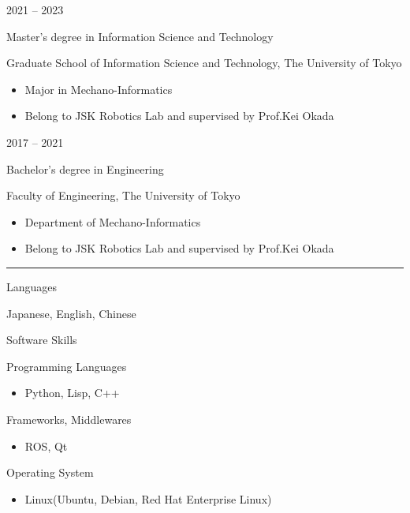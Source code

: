 \documentclass[a4paper,10pt]{article}
\newlength{\cvcolumngapwidth}
\newlength{\cvleftcolumnwidth}
\newlength{\cvrightcolumnwidth}
\newcommand{\cvsectionstyle}[1]{{\normalsize\cvsectionfont\textcolor{cvsectioncolor}{#1}}}
\newcommand{\cvtitlestyle}[1]{{\large\cvtitlefont\textcolor{cvtitlecolor}{#1}}}
\newcommand{\cvdurationstyle}[1]{{\small\cvdurationfont\textcolor{cvdurationcolor}{#1}}}
\newcommand{\cvheadingstyle}[1]{{\normalsize\cvheadingfont\textcolor{cvheadingcolor}{#1}}}
\newlength{\cvafteritemskipamount}
\newlength{\cvaftersectionskipamount}
\newlength{\cvbetweensectionandheadingextraskipamount}
\newlength{\cvaftertitleskipamount}
\newlength{\cvparskip}
\newcommand{\cvsection}[1]{
    \begin{minipage}[t]{\cvleftcolumnwidth}
        \raggedleft\cvsectionstyle{#1}
    \end{minipage}%
    \hspace{\cvcolumngapwidth}%
    \begin{minipage}[t]{\cvrightcolumnwidth}
        \textcolor{cvrulecolor}{\rule{\cvrightcolumnwidth}{0.3mm}}
    \end{minipage}

    \vspace{\cvaftersectionskipamount}
}
\newcommand{\cvitem}[2]{
    \begin{minipage}[t]{\cvleftcolumnwidth}
        \raggedleft #1
    \end{minipage}%
    \hspace{\cvcolumngapwidth}%
    \begin{minipage}[t]{\cvrightcolumnwidth}
        \setlength{\parskip}{\cvparskip} #2
    \end{minipage}

    \vspace{\cvafteritemskipamount}
}
\newcommand{\cvtitle}[1]{
    \cvtitlestyle{#1}

    \vspace{\cvaftertitleskipamount}
    \vspace{-\cvparskip}
}
\begin{document}
\cvitem{
    \cvdurationstyle{2021 -- 2023}
}{
    \cvtitle{Master's degree in Information Science and Technology}

    Graduate School of Information Science and Technology, The University of Tokyo

    \begin{itemize}[leftmargin=*]
        \item Major in Mechano-Informatics 
        \item Belong to JSK Robotics Lab and supervised by Prof.Kei Okada
    \end{itemize}
}

\cvitem{
    \cvdurationstyle{2017 -- 2021}
}{
    \cvtitle{Bachelor's degree in Engineering}

    Faculty of Engineering, The University of Tokyo

    \begin{itemize}[leftmargin=*]
        \item Department of Mechano-Informatics
        \item Belong to JSK Robotics Lab and supervised by Prof.Kei Okada
    \end{itemize}
}



\cvsection{SKILLS}

\vspace{\cvbetweensectionandheadingextraskipamount}

\cvitem{
    \cvheadingstyle{Languages}
}{
  Japanese, English, Chinese
}

\cvitem{
    \cvheadingstyle{Software Skills}
}{
  Programming Languages
  \begin{itemize}
    \item Python, Lisp, C++
  \end{itemize}
  Frameworks, Middlewares
  \begin{itemize}
    \item ROS, Qt
  \end{itemize}
  Operating System
  \begin{itemize}
    \item Linux(Ubuntu, Debian, Red Hat Enterprise Linux)
  \end{itemize}
}




\end{document}
